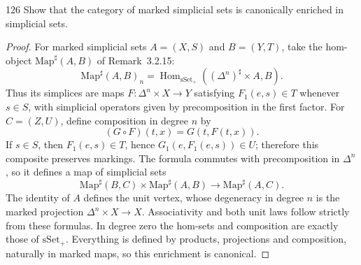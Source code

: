 \begin{exercise}{126}
Show that the category of marked simplicial sets is canonically enriched in
simplicial sets.

\begin{proof}
For marked simplicial sets $A=(X,S)$ and $B=(Y,T)$, take the hom-object
$\mathrm{Map}^{\sharp}(A,B)$ of Remark~3.2.15:
\[
 \mathrm{Map}^{\sharp}(A,B)_n
 =\operatorname{Hom}_{\mathrm{sSet}_+}
   ((\Delta^n)^{\sharp}\times A,B).
\]
Thus its simplices are maps $F\colon\Delta^n\times X\to Y$ satisfying
$F_1(e,s)\in T$ whenever $s\in S$, with simplicial operators given by
precomposition in the first factor.
For $C=(Z,U)$, define composition in degree $n$ by
\[
 (G\circ F)(t,x)=G(t,F(t,x)).
\]
If $s\in S$, then $F_1(e,s)\in T$, hence
$G_1(e,F_1(e,s))\in U$; therefore this composite preserves markings.
The formula commutes with precomposition in $\Delta^n$, so it defines
a map of simplicial sets
\[
 \mathrm{Map}^{\sharp}(B,C)\times\mathrm{Map}^{\sharp}(A,B)
 \longrightarrow\mathrm{Map}^{\sharp}(A,C).
\]
The identity of $A$ defines the unit vertex, whose degeneracy in degree $n$
is the marked projection $\Delta^n\times X\to X$.
Associativity and both unit laws follow strictly from these formulas.
In degree zero the hom-sets and composition are exactly those of
$\mathrm{sSet}_+$.
Everything is defined by products, projections and composition, naturally
in marked maps, so this enrichment is canonical.
\end{proof}
\end{exercise}
